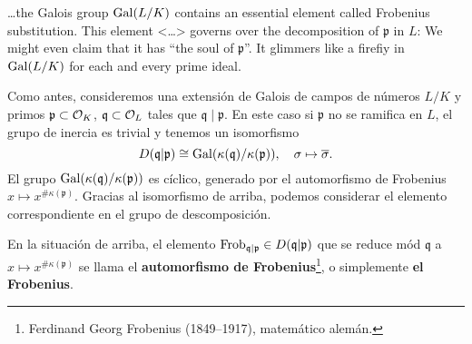 \epigraph{\dots{}the Galois group $\operatorname{Gal}(L/K)$ contains an essential element
  called Frobenius substitution. This element <\dots>{} governs over the
  decomposition of $\mathfrak{p}$ in $L$: We might even claim that it has
  “the soul of $\mathfrak{p}$”. It glimmers like a firefiy in $\operatorname{Gal} (L/K)$
  for each and every prime ideal.}{\cite[p.~18]{Kato-NT-2}}

Como antes, consideremos una extensión de Galois de campos de números $L/K$
y primos $\mathfrak{p} \subset \mathcal{O}_K$, $\mathfrak{q} \subset \mathcal{O}_L$ tales que
$\mathfrak{q}\mid\mathfrak{p}$. En este caso si $\mathfrak{p}$ no se ramifica
en $L$, el grupo de inercia es trivial y
tenemos un isomorfismo
\[ D (\mathfrak{q}|\mathfrak{p}) \cong
   \operatorname{Gal} (\kappa(\mathfrak{q})/\kappa(\mathfrak{p})), \quad
   \sigma \mapsto \overline{\sigma}. \]
El grupo $\operatorname{Gal} (\kappa(\mathfrak{q})/\kappa(\mathfrak{p}))$ es cíclico, generado
por el automorfismo de Frobenius $x \mapsto x^{\# \kappa(\mathfrak{p})}$.
Gracias al isomorfismo de arriba, podemos considerar el elemento correspondiente
en el grupo de descomposición.

\begin{definicion}
  En la situación de arriba, el elemento
  $\operatorname{Frob}_{\mathfrak{q}|\mathfrak{p}} \in D (\mathfrak{q}|\mathfrak{p})$
  que se reduce mód $\mathfrak{q}$ a $x \mapsto x^{\# \kappa(\mathfrak{p})}$
  se llama el \textbf{automorfismo de Frobenius}\footnote{Ferdinand Georg
    Frobenius (1849--1917), matemático alemán.}, o simplemente
  \textbf{el Frobenius}.
\end{definicion}

